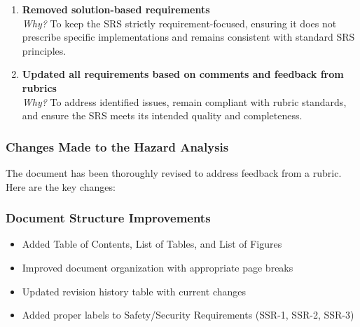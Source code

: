 \documentclass{article}
\begin{document}
\begin{enumerate}
    \item \textbf{Removed solution-based requirements} \\
    \textit{Why?} To keep the SRS strictly requirement-focused, ensuring it does not prescribe specific implementations and remains consistent with standard SRS principles.

    \item \textbf{Updated all requirements based on comments and feedback from rubrics} \\
    \textit{Why?} To address identified issues, remain compliant with rubric standards, and ensure the SRS meets its intended quality and completeness.
\end{enumerate}


\subsubsection{Changes Made to the Hazard Analysis}

The document has been thoroughly revised to address feedback from a rubric. Here are the key changes:

\subsubsection{Document Structure Improvements}
\begin{itemize}
  \item Added Table of Contents, List of Tables, and List of Figures
  \item Improved document organization with appropriate page breaks
  \item Updated revision history table with current changes
  \item Added proper labels to Safety/Security Requirements (SSR-1, SSR-2, SSR-3)
\end{itemize}
\end{document}
